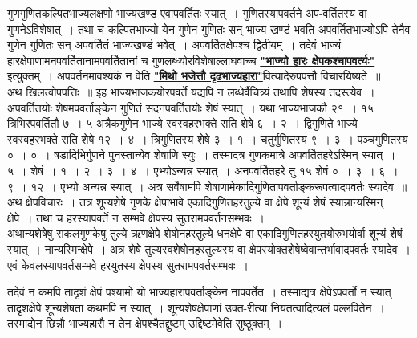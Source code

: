 \documentclass[11pt, openany]{book}
\begin{document}
\newpage%

\noindent गुणगुणितकल्पितभाज्यलक्षणो भाज्यखण्ड एवापवर्तितः स्यात्~। गुणितस्यापवर्तने अप-वर्तितस्य वा गुणनेऽविशेषात्~। तथा च कल्पितभाज्यो येन गुणेन 
गुणितः सन् भाज्य-खण्डं भवति अपवर्तितभाज्योऽपि तेनैव गुणेन गुणितः 
सन् अपवर्तितं भाज्यखण्डं भवेत्~। अपवर्तितक्षेपश्च द्वितीयम्~। तदेवं 
भाज्यं हारक्षेपाणामनपवर्तितानामपवर्तितानां च गुणलब्ध्योरविशेषाल्लाघवाच्च \hyperref[25]{\textbf{"भाज्यो हारः क्षेपकश्चापवर्त्यः"}} इत्युक्तम्~। अपवर्तनमावश्यकं न वेति \hyperref[27]{\textbf{"मिथो भजेत्तौ दृढभाज्यहारा"}}वित्यादेरुपपत्तौ विचारयिष्यते~॥ \\

\vspace{-3mm}
 अथ खिलत्वोपपत्तिः~॥ इह भाज्यभाजकयोरपवर्ते यद्यपि न लब्धेर्वैचित्र्यं तथापि शेषस्य तदस्त्येव~। अपवर्तितयोः शेषमपवर्ताङ्केन गुणितं
सदनपवर्तितयोः शेषं स्यात्~। यथा भाज्यभाजकौ २१~। १५ त्रिभिरपवर्तितौ ७~। ५ 
अत्रैकगुणेन भाज्ये स्वस्वहरभक्ते सति शेषे ६~। २~। द्विगुणिते भाज्ये 
स्वस्वहरभक्ते सति शेषे १२~। ४~। त्रिगुणितस्य शेषे ३~। १~। चतुर्गुणितस्य ९~। ३~। पञ्चगुणितस्य ०~। ०~। षडादिभिर्गुणने पुनस्तान्येव शेषाणि 
स्युः~। तस्मादत्र गुणकमात्रे अपवर्तितहरेऽस्मिन् स्यात्~। ५~। 
शेषं~। १~। २~। ३~। ४~। एभ्योऽन्यन्न \;स्यात्~। अनपवर्तितहरे \;तु १५ \;शेषं \;०~। ३~। ६~। ९~। १२~। एभ्यो अन्यन्न स्यात्~। अत्र सर्वेषामपि
शेषाणामेकादिगुणितापवर्ताङ्करूपत्वादपवर्तः स्यादेव~॥ \\

\vspace{-3mm}
 अथ क्षेपविचारः~। तत्र शून्यशेषे गुणके क्षेपाभावे एकादिगुणितहरतुल्ये वा क्षेपे शून्यं शेषं स्यान्नान्यस्मिन् क्षेपे~। तथा च हरस्यापवर्ते न सम्भवे क्षेपस्य सुतरामपवर्तनसम्भवः~। \\

\vspace{-3mm}
 अथान्यशेषेषु सकलगुणकेषु तुल्ये ऋणक्षेपे शेषोनहरतुल्ये धनक्षेपे 
वा एकादिगुणितहरयुतयोरुभयोर्वा शून्यं शेषं स्यात्~। नान्यस्मिन्क्षेपे~।
अत्र शेषे तुल्यस्वशेषोनहरतुल्यस्य वा क्षेपस्योक्तशेषेष्वेवान्तर्भावादपवर्तः \;स्यादेव~। एवं \;केवलस्यापवर्तसम्भवे हरयुतस्य क्षेपस्य सुतरामपवर्तसम्भवः~।

\newpage%
\noindent तदेवं न कमपि तादृशं क्षेपं पश्यामो यो भाज्यहारापवर्ताङ्केन 
नापवर्तेत~। तस्माद्यत्र क्षेपेऽपवर्तो न स्यात् तादृशक्षेपे शून्यशेषता कथमपि 
न स्यात्~। शून्यशेषक्षेपाणां उक्त-रीत्या नियतत्वादित्यलं पल्लवितेन~।
तस्माद्येन छिन्नौ भाज्यहारौ न तेन क्षेपश्चैतद्दुष्टम् उद्दिष्टमेवेति सुष्ठूक्तम्~। \\
\end{document}
